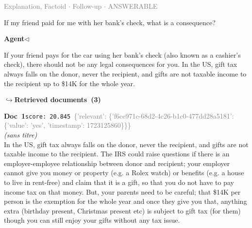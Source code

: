 \documentclass[a4paper,11pt]{article}
\begin{document}
\vspace{0.5em}
\hfill{\tiny\textcolor{gray}{Explanation, Factoid $\cdot$ Follow-up $\cdot$ ANSWERABLE}}
\begin{userbubble}
If my friend paid for me with her bank's check, what is a consequence?
\end{userbubble}
\noindent\hfill{\small\textcolor{agentcolor}{\textbf{Agent\enspace$\triangleleft$}}}
\begin{agentbubble}
If your friend pays for the car using her bank's check (also known as a cashier's check), there should not be any legal consequences for you.  In the US, gift tax always falls on the donor, never the recipient, and gifts are not taxable income to the recipient up to \$14K for the whole year.
\end{agentbubble}
\noindent\hfill{\footnotesize\textcolor{doccolor}{\textbf{$\hookrightarrow$\enspace Retrieved documents~(3)}}}
\begin{docenv}
{\footnotesize\textcolor{doccolor}{\textbf{Doc~1}}}\hfill{\tiny\texttt{score:~20.845}}\ {\tiny\textcolor{gray}{\{'relevant': \{'f6ce971c-68d2-4c26-b1c0-477dd28a5181': \{'value': 'yes', 'timestamp': 1723125860\}\}\}}}\\[3pt]
{\small\textit{(sans titre)}}\\[2pt]
\vspace{2pt}
{\footnotesize 
In the US, gift tax always falls on the donor, never the recipient, and gifts are not taxable income to the recipient. The IRS could raise questions if there is an employer-employee relationship between donor and recipient; your employer cannot give you money or property (e.g. a Rolex watch) or benefits (e.g. a house to live in rent-free) and claim that it is a gift, so that you do not have to pay income tax on that money.  But, your parents need to be careful; that \$14K per person is the exemption for the whole year and once they give you that, anything extra (birthday present, Christmas present etc) is subject to gift tax (for them) though you can still enjoy your gifts without any tax issue.}
\end{docenv}
\end{document}
